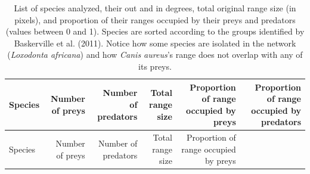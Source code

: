 \documentclass[10pt,oneside]{article}
\begin{document}
\hypertarget{tbl:everyone}{}
\begin{longtable}[]{@{}lrrrrr@{}}
\caption{\label{tbl:everyone}List of species analyzed, their out and in
degrees, total original range size (in pixels), and proportion of their
ranges occupied by their preys and predators (values between 0 and 1).
Species are sorted according to the groups identified by Baskerville et
al. (2011). Notice how some species are isolated in the network
(\emph{Loxodonta africana}) and how \emph{Canis aureus}'s range does not
overlap with any of its preys.}\tabularnewline
\toprule
\begin{minipage}[b]{0.28\columnwidth}\raggedright
Species\strut
\end{minipage} & \begin{minipage}[b]{0.10\columnwidth}\raggedleft
Number of preys\strut
\end{minipage} & \begin{minipage}[b]{0.10\columnwidth}\raggedleft
Number of predators\strut
\end{minipage} & \begin{minipage}[b]{0.10\columnwidth}\raggedleft
Total range size\strut
\end{minipage} & \begin{minipage}[b]{0.13\columnwidth}\raggedleft
Proportion of range occupied by preys\strut
\end{minipage} & \begin{minipage}[b]{0.13\columnwidth}\raggedleft
Proportion of range occupied by predators\strut
\end{minipage}\tabularnewline
\midrule
\endfirsthead
\toprule
\begin{minipage}[b]{0.28\columnwidth}\raggedright
Species\strut
\end{minipage} & \begin{minipage}[b]{0.10\columnwidth}\raggedleft
Number of preys\strut
\end{minipage} & \begin{minipage}[b]{0.10\columnwidth}\raggedleft
Number of predators\strut
\end{minipage} & \begin{minipage}[b]{0.10\columnwidth}\raggedleft
Total range size\strut
\end{minipage} & \begin{minipage}[b]{0.13\columnwidth}\raggedleft
Proportion of range occupied by preys\strut
\end{minipage} & \begin{minipage}[b]{0.13\columnwidth}\raggedleft

\end{minipage}
\end{longtable}
\end{document}
